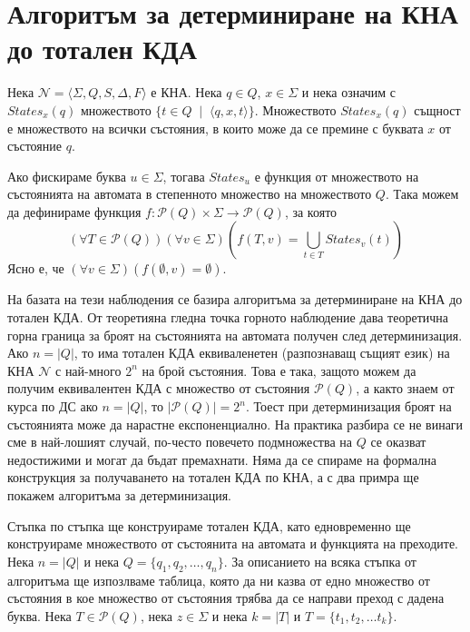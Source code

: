 \documentclass[12pt]{article}
\begin{document}
\section{Алгоритъм за детерминиране на КНА до тотален КДА}
Нека \(\mathcal{N} = \langle \Sigma, Q, S, \Delta, F \rangle\) е КНА.
Нека \(q \in Q\), \(x \in \Sigma\) и нека означим с \(States_x(q)\) множеството \(\{t \in Q \;\mid\; \langle q, x, t \rangle \}\).
Множеството \(States_x(q)\) същност е множеството на всички състояния, в които може да се премине с буквата \(x\) от състояние \(q\). \\\par
Ако фискираме буква \(u \in \Sigma\), тогава \(States_u\) е функция от множеството на състоянията на автомата в степенното множество на множеството \(Q\).
Така можем да дефинираме функция \(f : \mathcal{P}(Q) \times \Sigma \to \mathcal{P}(Q)\), за която 
\[(\forall T \in \mathcal{P}(Q))(\forall v \in \Sigma)\left(f(T, v) = \displaystyle\bigcup_{t \in T} States_v(t)\right)\]
Ясно е, че \((\forall v \in \Sigma)(f(\emptyset, v) = \emptyset)\). \\\par
На базата на тези наблюдения се базира алгоритъма за детерминиране на КНА до тотален КДА.
От теоретияна гледна точка горното наблюдение дава теоретична горна граница за броят на състоянията на автомата получен след детерминизация.
Ако \(n = |Q|\), то има тотален КДА еквиваленетен (разпознаващ същият език) на КНА \(\mathcal{N}\) с най-много \(2^n\) на брой състояния.
Това е така, защото можем да получим еквивалентен КДА с множество от състояния \(\mathcal{P}(Q)\),
а както знаем от курса по ДС ако \(n = |Q|\), то \(|\mathcal{P}(Q)| = 2^n\).
Тоест при детерминизация броят на състоянията може да нарастне експоненциално.
На практика разбира се не винаги сме в най-лошият случай, по-често повечето подмножества на \(Q\) се оказват недостижими и могат да бъдат премахнати.
Няма да се спираме на формална конструкция за получаването на тотален КДА по КНА, а с два примра ще покажем алгоритъма за детерминизация. \\\par
Стъпка по стъпка ще конструираме тотален КДА, като едновременно ще конструираме множеството от състоянита на автомата и функцията на преходите.
Нека \(n = |Q|\) и нека \(Q = \{q_1, q_2, \dots, q_n\}\). За описанието на всяка стъпка от алгоритъма ще изпозлваме таблица,
която да ни казва от едно множество от състояния в кое множество от състояния трябва да се направи преход с дадена буква.
Нека \(T \in \mathcal{P}(Q)\), нека \(z \in \Sigma\) и нека \(k = |T|\) и \(T = \{t_1, t_2, \dots t_k\}\).
\end{document}
